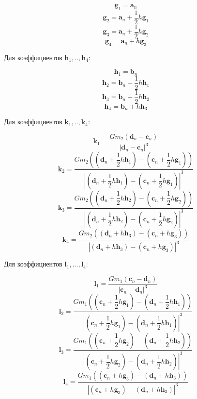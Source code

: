 \documentclass[11pt]{article}
\begin{document}
$$\boldsymbol g_1 = \boldsymbol a_n$$
$$\boldsymbol g_2 = \boldsymbol a_n + \dfrac {1} {2} h \boldsymbol g_1$$
$$\boldsymbol g_3 = \boldsymbol a_n + \dfrac {1} {2} h \boldsymbol g_2$$
$$\boldsymbol g_4 = \boldsymbol a_n + h \boldsymbol g_3$$

Для коэффициентов $\boldsymbol h_1, .., \boldsymbol h_4$:

$$\boldsymbol h_1 = \boldsymbol b_n$$
$$\boldsymbol h_2 = \boldsymbol b_n + \dfrac {1} {2} h \boldsymbol h_1$$
$$\boldsymbol h_3 = \boldsymbol b_n + \dfrac {1} {2} h \boldsymbol h_2$$
$$\boldsymbol h_4 = \boldsymbol b_n + h \boldsymbol h_3$$

Для коэффициентов $\boldsymbol k_1, .., \boldsymbol k_4$:

$$\boldsymbol k_1 = \dfrac {G m_2(\boldsymbol d_n - \boldsymbol c_n)} {|\boldsymbol d_n - \boldsymbol c_n|^3}$$
$$\boldsymbol k_2 = \dfrac {G m_2 \left ( \left ( \boldsymbol d_n + \dfrac {1} {2} h \boldsymbol h_1 \right ) - \left ( \boldsymbol c_n + \dfrac {1}{2} h \boldsymbol g_1 \right ) \right )} {\left | \left ( \boldsymbol d_n + \dfrac {1} {2} h \boldsymbol h_1 \right ) - \left ( \boldsymbol c_n + \dfrac {1}{2} h \boldsymbol g_1 \right ) \right |^3}$$
$$\boldsymbol k_3 = \dfrac {G m_2 \left ( \left ( \boldsymbol d_n + \dfrac {1} {2} h \boldsymbol h_2 \right ) - \left ( \boldsymbol c_n + \dfrac {1}{2} h \boldsymbol g_2 \right ) \right )} {\left | \left ( \boldsymbol d_n + \dfrac {1} {2} h \boldsymbol h_2 \right ) - \left ( \boldsymbol c_n + \dfrac {1}{2} h \boldsymbol g_2 \right ) \right |^3}$$
$$\boldsymbol k_4 = \dfrac {G m_2 \left ( \left ( \boldsymbol d_n + h \boldsymbol h_3 \right ) - \left ( \boldsymbol c_n + h \boldsymbol g_3 \right ) \right )} {\left | \left ( \boldsymbol d_n + h \boldsymbol h_3 \right ) - \left ( \boldsymbol c_n + h \boldsymbol g_3 \right ) \right |^3}$$

Для коэффициентов $\boldsymbol l_1, ..., \boldsymbol l_4$:

$$\boldsymbol l_1 = \dfrac {G m_1(\boldsymbol c_n - \boldsymbol d_n)} {|\boldsymbol c_n - \boldsymbol d_n|^3}$$
$$\boldsymbol l_2 = \dfrac {G m_1 \left ( \left ( \boldsymbol c_n + \dfrac {1} {2} h \boldsymbol g_1 \right ) - \left ( \boldsymbol d_n + \dfrac {1}{2} h \boldsymbol h_1 \right ) \right )} {\left | \left ( \boldsymbol c_n + \dfrac {1} {2} h \boldsymbol g_1 \right ) - \left ( \boldsymbol d_n + \dfrac {1}{2} h \boldsymbol h_1 \right ) \right |^3}$$
$$\boldsymbol l_3 = \dfrac {G m_1 \left ( \left ( \boldsymbol c_n + \dfrac {1} {2} h \boldsymbol g_2 \right ) - \left ( \boldsymbol d_n + \dfrac {1}{2} h \boldsymbol h_2 \right ) \right )} {\left | \left ( \boldsymbol c_n + \dfrac {1} {2} h \boldsymbol g_2 \right ) - \left ( \boldsymbol d_n + \dfrac {1}{2} h \boldsymbol h_2 \right ) \right |^3}$$
$$\boldsymbol l_4 = \dfrac {G m_1 \left ( \left ( \boldsymbol c_n + h \boldsymbol g_3 \right ) - \left ( \boldsymbol d_n + h \boldsymbol h_3 \right ) \right )} {\left | \left ( \boldsymbol c_n + h \boldsymbol g_3 \right ) - \left ( \boldsymbol d_n + h \boldsymbol h_3 \right ) \right |^3}$$
\end{document}
